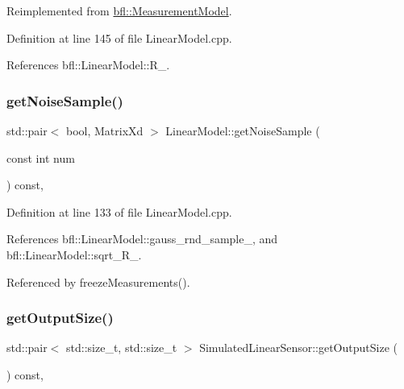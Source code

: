 Reimplemented from \mbox{\hyperlink{classbfl_1_1MeasurementModel_af25f42076b69e0c6cab47d36d796536f}{bfl\+::\+Measurement\+Model}}.



Definition at line 145 of file Linear\+Model.\+cpp.



References bfl\+::\+Linear\+Model\+::\+R\+\_\+.

\mbox{\label{classbfl_1_1LinearModel_af248dfa32cd9145d87e84ddade6316ad}} 
\subsubsection{\texorpdfstring{get\+Noise\+Sample()}{getNoiseSample()}}
{\footnotesize\ttfamily std\+::pair$<$ bool, Matrix\+Xd $>$ Linear\+Model\+::get\+Noise\+Sample (\begin{DoxyParamCaption}\item[{const int}]{num }\end{DoxyParamCaption}) const\hspace{0.3cm}{\ttfamily [protected]}, {\ttfamily [inherited]}}



Definition at line 133 of file Linear\+Model.\+cpp.



References bfl\+::\+Linear\+Model\+::gauss\+\_\+rnd\+\_\+sample\+\_\+, and bfl\+::\+Linear\+Model\+::sqrt\+\_\+\+R\+\_\+.



Referenced by freeze\+Measurements().

\mbox{\label{classbfl_1_1SimulatedLinearSensor_a00e869da2b16b5ead1d76a7b32e9fc4b}} 
\subsubsection{\texorpdfstring{get\+Output\+Size()}{getOutputSize()}}
{\footnotesize\ttfamily std\+::pair$<$ std\+::size\+\_\+t, std\+::size\+\_\+t $>$ Simulated\+Linear\+Sensor\+::get\+Output\+Size (\begin{DoxyParamCaption}{ }\end{DoxyParamCaption}) const\hspace{0.3cm}{\ttfamily [override]}, {\ttfamily [virtual]}}



